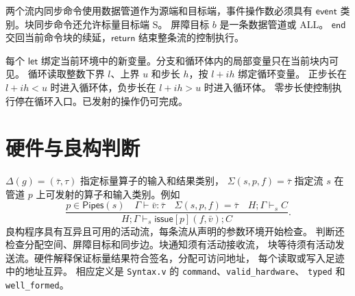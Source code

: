 \documentclass[UTF8,a4paper,11pt,fontset=fandol]{ctexart}
\newcommand{\kw}[1]{\mathsf{#1}}
\begin{document}
两个流内同步命令使用数据管道作为源端和目标端，事件操作数必须具有
\(\kw{event}\) 类别。块同步命令还允许标量目标端 \(\mathrm S\)。
屏障目标 \(b\) 是一条数据管道或 \(\mathrm{ALL}\)。
\(\kw{end}\) 交回当前命令块的续延，\(\kw{return}\) 结束整条流的控制执行。

每个 \(\kw{let}\) 绑定当前环境中的新变量。分支和循环体内的局部变量只在当前块内可见。
循环读取整数下界 \(l\)、上界 \(u\) 和步长 \(h\)，按 \(l+ih\) 绑定循环变量。
正步长在 \(l+ih<u\) 时进入循环体，负步长在 \(l+ih>u\) 时进入循环体。
零步长使控制执行停在循环入口。已发射的操作仍可完成。

\section{硬件与良构判断}
\(\Delta(g)=(\bar\tau,\tau)\) 指定标量算子的输入和结果类别，
\(\Sigma(s,p,f)=\bar\tau\) 指定流 \(s\) 在管道 \(p\) 上可发射的算子和输入类别。例如
\[
 \frac{p\in\mathsf{Pipes}(s)\quad\Gamma\vdash\bar v:\bar\tau\quad
       \Sigma(s,p,f)=\bar\tau\quad H;\Gamma\vdash_s C}
      {H;\Gamma\vdash_s\kw{issue}[p](f,\bar v);C}.
\]
良构程序具有互异且可用的活动流，每条流从声明的参数环境开始检查。
判断还检查分配空间、屏障目标和同步边。块通知须有活动接收流，
块等待须有活动发送流。硬件解释保证标量结果符合签名，分配可访问地址，
每个读取或写入足迹中的地址互异。
相应定义是 \texttt{Syntax.v} 的 \texttt{command}、\texttt{valid\_hardware}、
\texttt{typed} 和 \texttt{well\_formed}。
\end{document}
